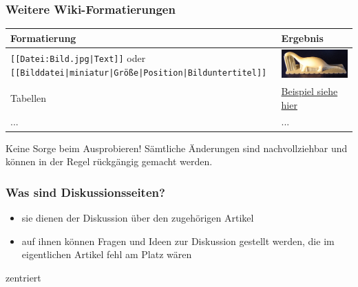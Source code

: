 \documentclass{beamer}
\begin{document}
\begin{frame}
  \frametitle{Weitere Wiki-Formatierungen}
  \begin{longtable}{|l|l|}
    \hline
    \textbf{Formatierung} & \textbf{Ergebnis} \\ 
    \hline
    \texttt{[[Datei:Bild.jpg|Text]]} oder \texttt{[[Bilddatei|miniatur|Größe|Position|Bilduntertitel]]}  &   \includegraphics[keepaspectratio=true, width=\textwidth]{rapid-dino.jpg} \\
    \hline
    Tabellen & \href{https://de.wikipedia.org/wiki/Hilfe:Tabellen}{Beispiel siehe hier} \\ 
    \hline
    \hline
    ... & ... \\     
    \hline
\end{longtable}

Keine Sorge beim Ausprobieren! Sämtliche Änderungen sind nachvollziehbar und können in der Regel rückgängig gemacht werden.
\end{frame}


\begin{frame}
  \frametitle{Was sind Diskussionsseiten?}

  \begin{itemize}
    \item sie dienen der Diskussion über den zugehörigen Artikel
    \item auf ihnen können Fragen und Ideen zur Diskussion gestellt werden,
      die im eigentlichen Artikel fehl am Platz wären
  \end{itemize}

  zentriert

\end{frame}
\end{document}
